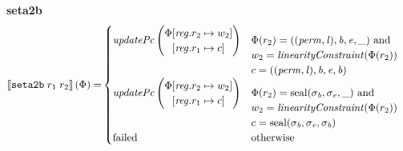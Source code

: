 \documentclass[a3paper]{article}
\newcommand{\sem}[1]{\left\llbracket #1 \right\rrbracket}
\newcommand{\tand}{\text{ and }}
\newcommand{\totherwise}{\text{otherwise }}
\newcommand{\targetcolor}[1]{\color{black}}
\newcommand{\trg}[1]{{\targetcolor{} #1}}
\newcommand{\zinstr}[1]{\texttt{#1}}
\newcommand{\twoinstr}[3]{
  \ifthenelse{\equal{#2#3}{}}
  {\zinstr{#1}}
  {\zinstr{#1} \; #2 \; #3}
}
\newcommand{\tsetatob}[2]{\twoinstr{\trg{seta2b}}{#1}{#2}}
\newcommand{\update}[2]{[#1 \mapsto #2]}
\newcommand{\updReg}[2]{\update{\reg.#1}{#2}}
\newcommand{\shareddom}[1]{\mathrm{#1}}
\newcommand{\perm}{\var{perm}}
\newcommand{\lin}{\var{l}}
\newcommand{\seal}[1]{\shareddom{seal}(#1)}
\newcommand{\failed}{\mathrm{failed}}
\newcommand{\var}[1]{\mathit{#1}}
\newcommand{\reg}{\var{reg}}
\newcommand{\baddr}{\var{b}}
\newcommand{\eaddr}{\var{e}}
\newcommand{\plainfun}[2]{
  \ifthenelse{\equal{#2}{}}
  {\mathit{#1}}
  {\mathit{#1}(#2)}
}
\newcommand{\linCons}[1]{\plainfun{linearityConstraint}{#1}}
\newcommand{\updPcAddr}[1]{\plainfun{updatePc}{#1}}
\begin{document}
\noindent\textbf{seta2b}\\
\begin{align*}
  \sem{\tsetatob{r_1}{r_2}}(\Phi) = & 
                                \begin{cases}
                                  \updPcAddr{}\left(
                                    \arraycolsep=0pt
                                    \begin{array}{rl}
                                    \Phi&\updReg{r_2}{w_2}\\
                                        &\updReg{r_1}{c}
                                    \end{array} \right)
&
                                    \arraycolsep=0pt
                                    \begin{array}[t]{l}
                                      \Phi(r_2) = ((\perm,\lin),\baddr,\eaddr,\_) \tand \\
                                      w_2 = \linCons{\Phi(r_2)}\\
                                      c = ((\perm,\lin),\baddr,\eaddr,\baddr)
                                    \end{array} \\
                                  \updPcAddr{}\left(
                                    \arraycolsep=0pt
                                    \begin{array}{rl}
                                    \Phi&\updReg{r_2}{w_2}\\
                                        &\updReg{r_1}{c}
                                    \end{array} \right)
&
                                    \arraycolsep=0pt
                                    \begin{array}[t]{l}
                                      \Phi(r_2) = \seal{\sigma_\baddr,\sigma_\eaddr,\_} \tand \\
                                      w_2 = \linCons{\Phi(r_2)}\\
                                      c = \seal{\sigma_\baddr,\sigma_\eaddr,\sigma_\baddr}
                                    \end{array} \\
                                    \failed & \totherwise
                                \end{cases}
\end{align*}
\end{document}
